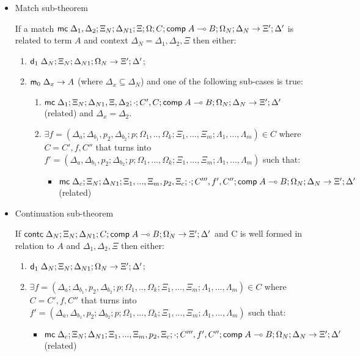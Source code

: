 \begin{itemize}
   \item Match sub-theorem

If a match $\mathsf{mc} \; \Delta_1, \Delta_2; \Xi_N; \Delta_{N1}; \Xi; \Omega; C; \mathsf{comp} \; A \multimap B; \Omega_N; \Delta_N \rightarrow \Xi'; \Delta'$ is related to term $A$ and context $\Delta_{N} = \Delta_1, \Delta_2, \Xi$ then either:

\begin{enumerate}
   \item $\mathsf{d}_1 \; \Delta_N; \Xi_N; \Delta_{N1}; \Omega_N \rightarrow \Xi'; \Delta'$;
   \item $\mathsf{m}_0 \; \Delta_x \rightarrow A$ (where $\Delta_x \subseteq \Delta_N$) and one of the following sub-cases is true:
   
      \begin{enumerate}
         \item $\mathsf{mc} \; \Delta_1; \Xi_N; \Delta_{N1}, \Xi, \Delta_2; \cdot; C', C; \mathsf{comp} \; A \multimap B; \Omega_N; \Delta_N \rightarrow \Xi'; \Delta'$ (related) and $\Delta_x = \Delta_2$.
         \item $\exists f = (\Delta_a; \Delta_{b_1}, p_2, \Delta_{b_2}; p; \Omega_1, .., \Omega_k; \Xi_1, ..., \Xi_m; \Lambda_1, ..., \Lambda_m) \in C$ where $C= C', f, C''$ that turns into $f' = (\Delta_a, \Delta_{b_1}, p_2; \Delta_{b_2}; p; \Omega_1, ..., \Omega_k; \Xi_1, ..., \Xi_m; \Lambda_1, ..., \Lambda_m)$ such that:
         \begin{itemize}
            \item $\mathsf{mc} \; \Delta_c; \Xi_N; \Delta_{N1}; \Xi_1, ..., \Xi_m, p_2, \Xi_c; \cdot; C''', f', C''; \mathsf{comp} \; A \multimap B; \Omega_N; \Delta_N \rightarrow \Xi'; \Delta'$ (related)
         \end{itemize}
      \end{enumerate}
\end{enumerate}

\item Continuation sub-theorem

If $\mathsf{contc} \; \Delta_N; \Xi_N; \Delta_{N1}; C; \mathsf{comp} \; A \multimap B; \Omega_N \rightarrow \Xi'; \Delta'$ and C is well formed in relation to $A$ and $\Delta_1, \Delta_2, \Xi$ then either:

\begin{enumerate}
   \item $\mathsf{d}_1 \; \Delta_N; \Xi_N; \Delta_{N1}; \Omega_N \rightarrow \Xi'; \Delta'$;
   \item $\exists f = (\Delta_a; \Delta_{b_1}, p_2, \Delta_{b_2}; p; \Omega_1, .., \Omega_k; \Xi_1, ..., \Xi_m; \Lambda_1, ..., \Lambda_m) \in C$ where $C= C', f, C''$ that turns into $f' = (\Delta_a, \Delta_{b_1}, p_2; \Delta_{b_2}; p; \Omega_1, ..., \Omega_k; \Xi_1, ..., \Xi_m; \Lambda_1, ..., \Lambda_m)$ such that:
   \begin{itemize}
      \item $\mathsf{mc} \; \Delta_c; \Xi_N; \Delta_{N1}; \Xi_1, ..., \Xi_m, p_2, \Xi_c; \cdot; C''', f', C''; \mathsf{comp} \; A \multimap B; \Omega_N; \Delta_N \rightarrow \Xi'; \Delta'$ (related)
   \end{itemize}
\end{enumerate}

\end{itemize}

